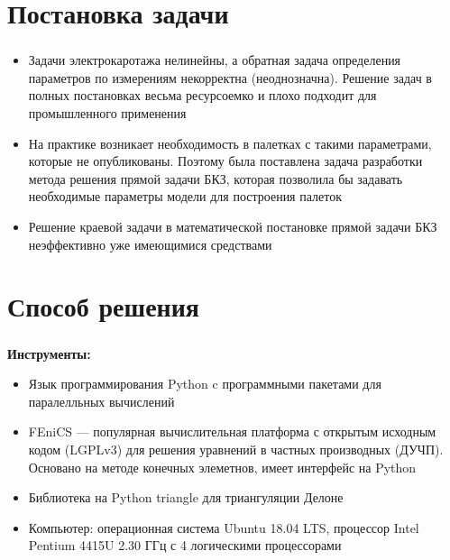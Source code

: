

\frame[plain]{\titlepage} %


\section{Постановка задачи}

\begin{frame}
\frametitle{\insertsection}

\begin{itemize}    
    \item Задачи электрокаротажа нелинейны, а обратная
    задача определения параметров по измерениям
    некорректна (неоднозначна). Решение задач в
    полных постановках весьма ресурсоемко и плохо
    подходит для промышленного применения

    \item На практике возникает необходимость в палетках с такими параметрами,
    которые не опубликованы. Поэтому была поставлена задача разработки метода
    решения прямой задачи БКЗ, которая позволила бы задавать необходимые
    параметры модели для построения палеток

    \item Решение краевой задачи в математической постановке прямой задачи БКЗ неэффективно уже имеющимися средствами
\end{itemize}
\end{frame}


\section{Способ решения}

\begin{frame}
\frametitle{\insertsection}

\textbf{Инструменты:}
\begin{itemize}
    \item Язык программирования Python c программными пакетами для паралелльных вычислений

    \item FEniCS — популярная вычислительная платформа с открытым исходным
    кодом (LGPLv3) для решения уравнений в частных производных (ДУЧП). Основано на методе конечных элеметнов, имеет интерфейс на Python

    \item Библиотека на Python triangle для триангуляции Делоне
    \item Компьютер: операционная система
    Ubuntu 18.04 LTS, процессор Intel Pentium 4415U 2.30 ГГц с 4 логическими
    процессорами
\end{itemize}
\end{frame}

